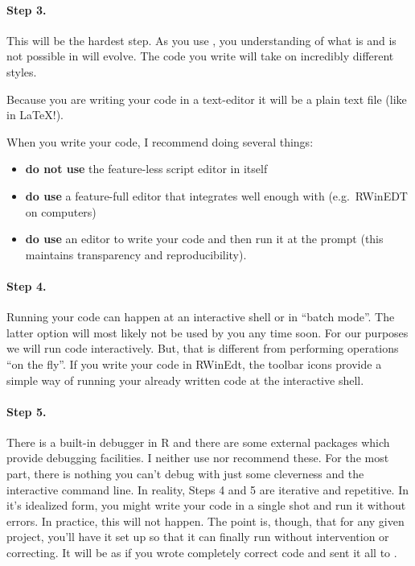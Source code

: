 \paragraph{Step 3.} This will be the hardest step. As you use \R{}, you
understanding of what is and is not possible in \R{} will evolve. The
code you write will take on incredibly different styles.

\par Because you are writing your \R{} code in a text-editor it will
be a plain text file (like in \LaTeX{}!).

\par When you write your \R{} code, I recommend doing several things:
\begin{itemize}
\item \textbf{do not use} the feature-less script editor in \R{}
  itself

\item \textbf{do use} a feature-full editor that integrates well
  enough with \R{} (e.g.\ RWinEDT on \tsl{} computers)

\item \textbf{do use} an editor to write your code and then run it at
  the \R{} prompt (this maintains transparency and reproducibility).

\end{itemize}

\paragraph{Step 4.} Running your code can happen at an interactive
\R{} shell or in ``batch mode''. The latter option will most likely
not be used by you any time soon. For our purposes we will run code
interactively. But, that is different from performing operations ``on
the fly''. If you write your code in RWinEdt, the toolbar icons
provide a simple way of running your already written code at the
interactive shell.

\paragraph{Step 5.} There is a built-in debugger in R and there are
some external packages which provide debugging facilities. I neither
use nor recommend these. For the most part, there is nothing you can't
debug with just some cleverness and the interactive command line. In
reality, Steps 4 and 5 are iterative and repetitive. In it's idealized
form, you might write your code in a single shot and run it without
errors. In practice, this will not happen. The point is, though, that
for any given project, you'll have it set up so that it can finally
run without intervention or correcting. It will be as if you wrote
completely correct code and sent it all to \R{}.

